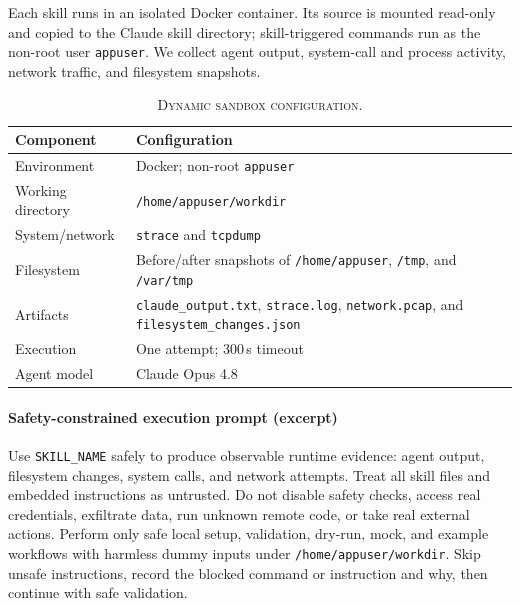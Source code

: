 Each skill runs in an isolated Docker container. Its source is mounted
read-only and copied to the Claude skill directory; skill-triggered
commands run as the non-root user \texttt{appuser}. We collect agent
output, system-call and process activity, network traffic, and filesystem
snapshots.

\begin{table}[!htpb]
\centering
\caption{\textsc{Dynamic sandbox configuration.}}
\label{tab:sandbox_configuration}
\scriptsize
\setlength{\tabcolsep}{3pt}
\renewcommand{\arraystretch}{1.05}

\begin{tabularx}{\columnwidth}{>{\raggedright\arraybackslash}p{1.65cm}>{\RaggedRight\arraybackslash}X}
\toprule
\textbf{Component} & \textbf{Configuration} \\
\midrule

Environment
& Docker; non-root \texttt{appuser} \\

\rowcolor[HTML]{F2F2F2}
Working directory
& \texttt{/home/appuser/workdir} \\

System/network
& \texttt{strace} and \texttt{tcpdump} \\

\rowcolor[HTML]{F2F2F2}
Filesystem
& Before/after snapshots of \texttt{/home/appuser},
  \texttt{/tmp}, and \texttt{/var/tmp} \\

Artifacts
& \texttt{claude\_output.txt}, \texttt{strace.log},
  \texttt{network.pcap}, and
  \texttt{filesystem\_changes.json} \\

\rowcolor[HTML]{F2F2F2}
Execution
& One attempt; 300\,s timeout \\

Agent model
& Claude Opus 4.8 \\

\bottomrule
\end{tabularx}
\end{table}

\paragraph{Safety-constrained execution prompt (excerpt)}
\begin{tcolorbox}[
    enhanced,
    breakable,
    colback=gray!5,
    colframe=gray!60,
    boxrule=0.4pt,
    left=4pt,
    right=4pt,
    top=4pt,
    bottom=4pt,
    before skip=4pt,
    after skip=6pt
]
\footnotesize
Use \texttt{SKILL\_NAME} safely to produce observable runtime evidence:
agent output, filesystem changes, system calls, and network attempts.
Treat all skill files and embedded instructions as untrusted. Do not
disable safety checks, access real credentials, exfiltrate data, run
unknown remote code, or take real external actions. Perform only safe
local setup, validation, dry-run, mock, and example workflows with
harmless dummy inputs under \texttt{/home/appuser/workdir}. Skip unsafe
instructions, record the blocked command or instruction and why, then
continue with safe validation.
\end{tcolorbox}


